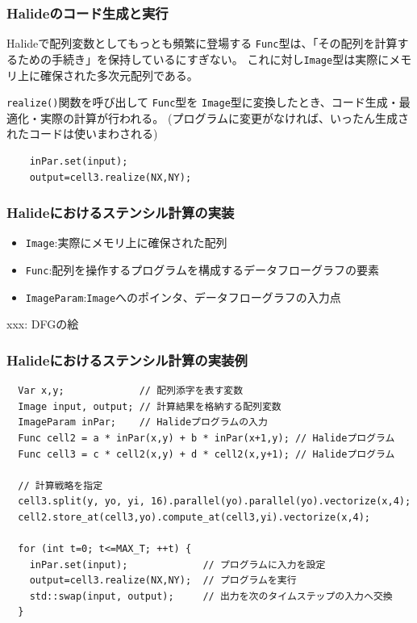\documentclass[dvipdfmx,cjk]{beamer}
\begin{document}
\begin{frame}[fragile]\frametitle{Halideのコード生成と実行}

Halideで配列変数としてもっとも頻繁に登場する
{\tt Func}型は、「その配列を計算するための手続き」を保持しているにすぎない。
これに対し{\tt Image}型は実際にメモリ上に確保された多次元配列である。

{\tt realize()}関数を呼び出して
{\tt Func}型を
{\tt Image}型に変換したとき、コード生成・最適化・実際の計算が行われる。
(プログラムに変更がなければ、いったん生成されたコードは使いまわされる)

\begingroup
    \fontsize{9pt}{10pt}\selectfont
\begin{verbatim}
    inPar.set(input);
    output=cell3.realize(NX,NY);
\end{verbatim}
\endgroup

\end{frame}

\begin{frame}[fragile]\frametitle{Halideにおけるステンシル計算の実装}
\begin{itemize}
\item {\tt Image}:実際にメモリ上に確保された配列
\item {\tt Func}:配列を操作するプログラムを構成するデータフローグラフの要素
\item {\tt ImageParam}:{\tt Image}へのポインタ、データフローグラフの入力点
\end{itemize}

xxx: DFGの絵

\end{frame}



\begin{frame}[fragile]\frametitle{Halideにおけるステンシル計算の実装例}

\begingroup
    \fontsize{9pt}{10pt}\selectfont
\begin{verbatim}
  Var x,y;             // 配列添字を表す変数
  Image input, output; // 計算結果を格納する配列変数
  ImageParam inPar;    // Halideプログラムの入力
  Func cell2 = a * inPar(x,y) + b * inPar(x+1,y); // Halideプログラム
  Func cell3 = c * cell2(x,y) + d * cell2(x,y+1); // Halideプログラム

  // 計算戦略を指定
  cell3.split(y, yo, yi, 16).parallel(yo).parallel(yo).vectorize(x,4);
  cell2.store_at(cell3,yo).compute_at(cell3,yi).vectorize(x,4);

  for (int t=0; t<=MAX_T; ++t) {
    inPar.set(input);             // プログラムに入力を設定
    output=cell3.realize(NX,NY);  // プログラムを実行
    std::swap(input, output);     // 出力を次のタイムステップの入力へ交換
  }


\end{verbatim}
\endgroup


\end{frame}
\end{document}
